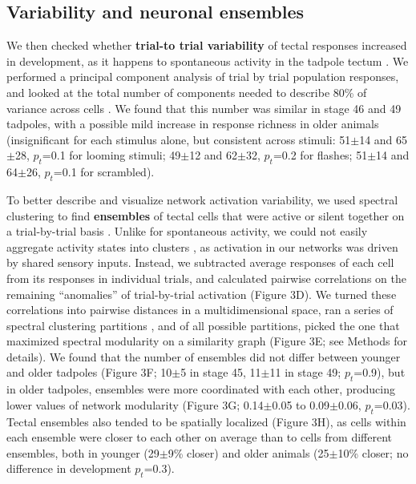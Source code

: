 \documentclass{article}
\begin{document}
\subsection*{Variability and neuronal ensembles}

We then checked whether \textbf{trial-to trial variability} of tectal responses increased in development, as it happens to spontaneous activity in the tadpole tectum \citep{xu2011}. We performed a principal component analysis of trial by trial population responses, and looked at the total number of components needed to describe 80\% of variance across cells \citep{avitan2017spontaneous}. We found that this number was similar in stage 46 and 49 tadpoles, with a possible mild increase in response richness in older animals (insignificant for each stimulus alone, but consistent across stimuli: 51$\pm$14 and 65$\pm$28, $p_t$=0.1 for looming stimuli; 49$\pm$12 and 62$\pm$32, $p_t$=0.2 for flashes; 51$\pm$14 and 64$\pm$26, $p_t$=0.1 for scrambled).

To better describe and visualize network activation variability, we used spectral clustering to find \textbf{ensembles} of tectal cells that were active or silent together on a trial-by-trial basis \citep{thompson2016ensembles}. Unlike for spontaneous activity, we could not easily aggregate activity states into clusters \citep{avitan2017spontaneous}, as activation in our networks was driven by shared sensory inputs. Instead, we subtracted average responses of each cell from its responses in individual trials, and calculated pairwise correlations on the remaining “anomalies” of trial-by-trial activation (Figure 3D). We turned these correlations into pairwise distances in a multidimensional space, ran a series of spectral clustering partitions \citep{ng2002spectral}, and of all possible partitions, picked the one that maximized spectral modularity on a similarity graph \citep{newman2006modularity, gomez2009community} (Figure 3E; see Methods for details). We found that the number of ensembles did not differ between younger and older tadpoles (Figure 3F; 10$\pm$5 in stage 45, 11$\pm$11 in stage 49; $p_t$=0.9), but in older tadpoles, ensembles were more coordinated with each other,  producing lower values of network modularity (Figure 3G; 0.14$\pm$0.05 to 0.09$\pm$0.06, $p_t$=0.03). Tectal ensembles also tended to be spatially localized (Figure 3H), as cells within each ensemble were closer to each other on average than to cells from different ensembles, both in younger (29$\pm$9\% closer) and older animals (25$\pm$10\% closer; no difference in development $p_t$=0.3).
\end{document}
